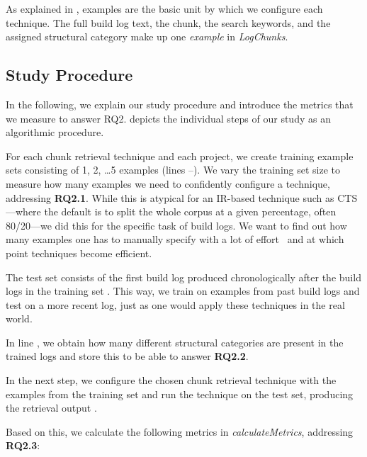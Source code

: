 \documentclass[10pt,journal,compsoc]{IEEEtran}
\newcommand\circlenum[1]{\raisebox{1.2pt}{\textcircled{\hspace{0.35pt}\scriptsize{\raisebox{-.4pt}{#1}}}}}
\begin{document}
As explained in , examples are the basic
unit by which we configure each technique.
The full build log text,
the chunk, the search keywords, and the assigned
structural category make
up one \emph{example} in \emph{LogChunks}.

\subsection{Study Procedure}

In the following, we explain our study procedure
and introduce the metrics that
we measure to answer RQ2.
 depicts the individual steps of our study as an
algorithmic procedure.

For each chunk retrieval technique and each project, we create
training example sets consisting of 1, 2, \dots 5 examples (lines
\circlenum{1}--\circlenum{3}).
We vary the training set size to measure how many examples we need to
confidently configure a technique, addressing \textbf{RQ2.1}.
While this is atypical for an IR-based technique such as CTS---where
the default is to split the whole corpus at a given percentage, often
80/20---we did this for the specific task of build logs.
We want to find out how many examples one has to manually specify with a
lot of effort~ and at which point techniques
become efficient.

The test set consists of the first build log produced
chronologically after the build logs in the training set \circlenum{5}.
This way, we train on examples from past build logs and test on
a more recent log, just as one would apply these techniques in the
real world.

In line \circlenum{6}, we obtain how many different structural categories
are present in the trained logs and store this to be able to answer
\textbf{RQ2.2}.

In the next step, we configure the chosen chunk retrieval technique with
the examples from the training set \circlenum{8} and run the technique
on the
test set, producing the retrieval output \circlenum{9}.

Based on this, we calculate the following metrics in
\emph{calculateMetrics}, addressing \textbf{RQ2.3}:
\end{document}
